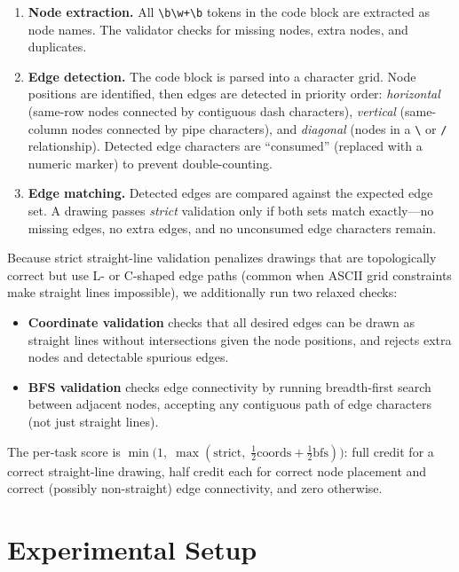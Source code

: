 \documentclass{article}
\begin{document}
\begin{enumerate}[nosep]
\item \textbf{Node extraction.} All \verb|\b\w+\b| tokens in the code block are extracted as node names. The validator checks for missing nodes, extra nodes, and duplicates.

\item \textbf{Edge detection.} The code block is parsed into a character grid. Node positions are identified, then edges are detected in priority order: \emph{horizontal} (same-row nodes connected by contiguous dash characters), \emph{vertical} (same-column nodes connected by pipe characters), and \emph{diagonal} (nodes in a \texttt{\textbackslash} or \texttt{/} relationship). Detected edge characters are ``consumed'' (replaced with a numeric marker) to prevent double-counting.

\item \textbf{Edge matching.} Detected edges are compared against the expected edge set. A drawing passes \emph{strict} validation only if both sets match exactly---no missing edges, no extra edges, and no unconsumed edge characters remain.
\end{enumerate}

Because strict straight-line validation penalizes drawings that are topologically correct but use L- or C-shaped edge paths (common when ASCII grid constraints make straight lines impossible), we additionally run two relaxed checks:
\begin{itemize}[nosep]
\item \textbf{Coordinate validation} checks that all desired edges can be drawn as straight lines without intersections given the node positions, and rejects extra nodes and detectable spurious edges.
\item \textbf{BFS validation} checks edge connectivity by running breadth-first search between adjacent nodes, accepting any contiguous path of edge characters (not just straight lines).
\end{itemize}
The per-task score is $\min\!\bigl(1,\;\max(\text{strict},\;\tfrac{1}{2}\text{coords} + \tfrac{1}{2}\text{bfs})\bigr)$: full credit for a correct straight-line drawing, half credit each for correct node placement and correct (possibly non-straight) edge connectivity, and zero otherwise.

\section{Experimental Setup}
\end{document}
